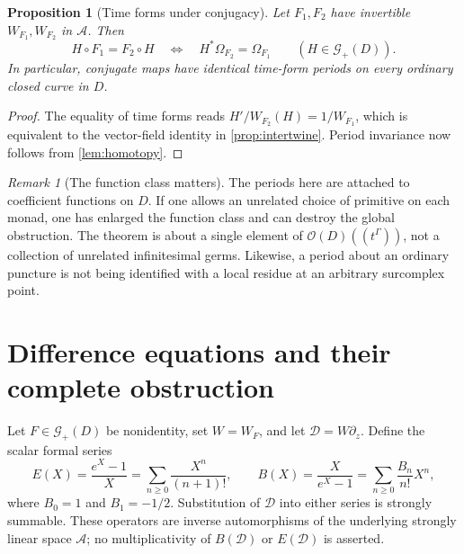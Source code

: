 \documentclass[11pt,a4paper]{article}
\numberwithin{equation}{section}
\newtheorem{proposition}[proposition]{Proposition}
\theoremstyle{definition}
\theoremstyle{remark}
\newtheorem{remark}[remark]{Remark}
\newcommand{\A}{\mathcal A}
\newcommand{\G}{\mathcal G}
\newcommand{\Oh}{\mathcal O}
\newcommand{\DD}{\mathscr D}
\begin{document}
\begin{proposition}[Time forms under conjugacy]\label{prop:time-conjugacy}
Let $F_1,F_2$ have invertible $W_{F_1},W_{F_2}$ in $\A$.  Then
\[
 H\circ F_1=F_2\circ H
 \quad\Longleftrightarrow\quad
 H^*\Omega_{F_2}=\Omega_{F_1}
 \qquad(H\in\G_+(D)).
\]
In particular, conjugate maps have identical time-form periods on every
ordinary closed curve in $D$.
\end{proposition}
\begin{proof}
The equality of time forms reads
$H'/W_{F_2}(H)=1/W_{F_1}$, which is equivalent to the vector-field identity
in \cref{prop:intertwine}.  Period invariance now follows from
\cref{lem:homotopy}.
\end{proof}

\begin{remark}[The function class matters]
The periods here are attached to coefficient functions on $D$.  If one
allows an unrelated choice of primitive on each monad, one has enlarged the
function class and can destroy the global obstruction.  The theorem is
about a single element of $\Oh(D)((t^\Gamma))$, not a collection of
unrelated infinitesimal germs.  Likewise, a period about an ordinary
puncture is not being identified with a local residue at an arbitrary
surcomplex point.
\end{remark}

\section{Difference equations and their complete obstruction}
\label{sec:difference}

Let $F\in\G_+(D)$ be nonidentity, set $W=W_F$, and let
$\DD=W\partial_z$.  Define the scalar formal series
\begin{equation}\label{eq:E-B}
 E(X)=\frac{e^X-1}{X}=\sum_{n\geq0}\frac{X^n}{(n+1)!},\qquad
 B(X)=\frac{X}{e^X-1}=\sum_{n\geq0}\frac{B_n}{n!}X^n,
\end{equation}
where $B_0=1$ and $B_1=-1/2$.  Substitution of $\DD$ into either series
is strongly summable.  These operators are inverse automorphisms of the
underlying strongly linear space $\A$; no multiplicativity of $B(\DD)$
or $E(\DD)$ is asserted.
\end{document}
